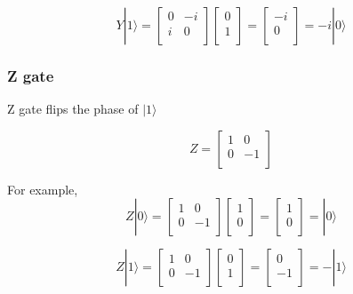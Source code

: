 $$ Y|1\rangle = \begin{bmatrix}
0 & -i \\
i & 0 \\
\end{bmatrix} 
\left[
\begin{array}{c}
0 \\
1  \\
\end{array}
\right]
= \left[
\begin{array}{c}
-i \\
0 \\
\end{array}
\right]
= -i|0\rangle
$$

\subsubsection{Z gate}

Z gate flips the phase of $ |1\rangle$

$$ Z = \begin{bmatrix}
1 & 0 \\
0 & -1 \\
\end{bmatrix}
$$

For example,
$$ Z|0\rangle = \begin{bmatrix}
1 & 0 \\
0 & -1 \\
\end{bmatrix} 
\left[
\begin{array}{c}
1 \\
0 \\
\end{array}
\right]
= \left[
\begin{array}{c}
1 \\
0 \\
\end{array}
\right]
= |0\rangle
$$

$$ Z|1\rangle = \begin{bmatrix}
1 & 0 \\
0 & -1 \\
\end{bmatrix} 
\left[
\begin{array}{c}
0 \\
1  \\
\end{array}
\right]
= \left[
\begin{array}{c}
0 \\
-1 \\
\end{array}
\right]
= -|1\rangle
$$

